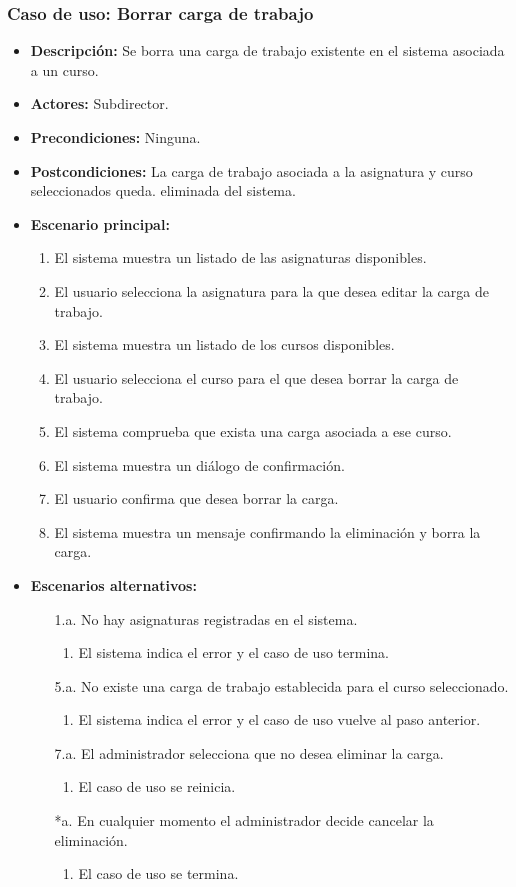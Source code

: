 \documentclass{book}
\begin{document}
\subsubsection*{Caso de uso: Borrar carga de trabajo}
\begin{itemize}
\item{\bf Descripción:} Se borra una carga de trabajo existente en el sistema asociada a un curso.
\item{\bf Actores:} Subdirector.
\item{\bf Precondiciones:} Ninguna.
\item{\bf Postcondiciones:} La carga de trabajo asociada a la asignatura y curso seleccionados queda. eliminada del sistema.
\item{\bf Escenario principal:}
	\begin{enumerate}
	\item El sistema muestra un listado de las asignaturas disponibles.
	\item El usuario selecciona la asignatura para la que desea editar la carga de trabajo.
	\item El sistema muestra un listado de los cursos disponibles.
	\item El usuario selecciona el curso para el que desea borrar la carga de trabajo.
	\item El sistema comprueba que exista una carga asociada a ese curso.
	\item El sistema muestra un diálogo de confirmación.
	\item El usuario confirma que desea borrar la carga.
	\item El sistema muestra un mensaje confirmando la eliminación y borra la carga.
	\end{enumerate}
\item{\bf Escenarios alternativos:}
	\begin{itemize}
	\item[1.a.] No hay asignaturas registradas en el sistema.
		\begin{enumerate}
		\item El sistema indica el error y el caso de uso termina.
		\end{enumerate}
	\item[5.a.] No existe una carga de trabajo establecida para el curso seleccionado.
		\begin{enumerate}
		\item El sistema indica el error y el caso de uso vuelve al paso anterior.
		\end{enumerate}
	\item[7.a.] El administrador selecciona que no desea eliminar la carga.
		\begin{enumerate}
		\item El caso de uso se reinicia.
		\end{enumerate}
	\item[*a.] En cualquier momento el administrador decide cancelar la eliminación.
		\begin{enumerate}
		\item El caso de uso se termina.
		\end{enumerate}
	\end{itemize}
\end{itemize}
\end{document}
